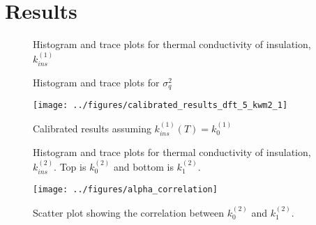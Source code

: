 \documentclass[article]{proc}
\begin{document}
\section{Results}

\begin{figure}[b!]
    \centering
    \qquad
    \caption{Histogram and trace plots for thermal conductivity of insulation, $k^{(1)}_{ins}$}
    \label{fig:param_trace_1}
\end{figure}

\begin{figure}[b!]
    \centering
    \qquad
    \caption{Histogram and trace plots for $\sigma_q^2$}
    \label{fig:sigma_trace_1}
\end{figure}

\begin{figure}
    \centering
    \texttt{[image: ../figures/calibrated\_results\_dft\_5\_kwm2\_1]}
    \caption{Calibrated results assuming $k^{(1)}_{ins}(T) = k^{(1)}_0$}
    \label{fig:cal_results_1}
\end{figure}

\begin{figure}[b!]
    \centering
    \qquad

    \qquad
    \caption{Histogram and trace plots for thermal conductivity of insulation, $k^{(2)}_{ins}$. Top is $k^{(2)}_0$ and bottom is $k^{(2)}_1$.}
    \label{fig:param_trace_2}
\end{figure}

\begin{figure}
    \centering
    \texttt{[image: ../figures/alpha\_correlation]}
    \caption{Scatter plot showing the correlation between $k^{(2)}_0$ and $k^{(2)}_1$.}
    \label{fig:alpha_correlation}
\end{figure}
\end{document}
